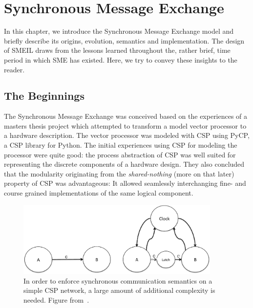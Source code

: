 \chapter{Synchronous Message Exchange}
\label{sec:sme}
In this chapter, we introduce the Synchronous Message Exchange model and briefly
describe its origins, evolution, semantics and implementation. The design of
SMEIL draws from the lessons learned throughout the, rather brief, time period
in which SME has existed. Here, we try to convey these insights to the reader.

\section{The Beginnings}
The Synchronous Message Exchange was conceived
based on the experiences of a masters thesis project \cite{Skaarup14} which
attempted to transform a model vector processor to a hardware description. The
vector processor was modeled with CSP using PyCP, a CSP library for Python. The
initial experiences using CSP for modeling the processor were quite good: the
process abstraction of CSP was well suited for representing the discrete
components of a hardware design. They also concluded that the modularity
originating from the {\itshape shared-nothing} (more on that later) property of CSP
was advantageous: It allowed seamlessly interchanging fine- and course grained
implementations of the same logical component.

\begin{figure}
  \centering
  \includegraphics[width=0.9\textwidth]{figures/clocked.pdf}
  \caption{In order to enforce synchronous communication semantics on a simple
    CSP network, a large amount of additional complexity is needed. Figure
    from~\cite{vinter2014synchronous}.}
  \label{fig:clocked}
\end{figure}


